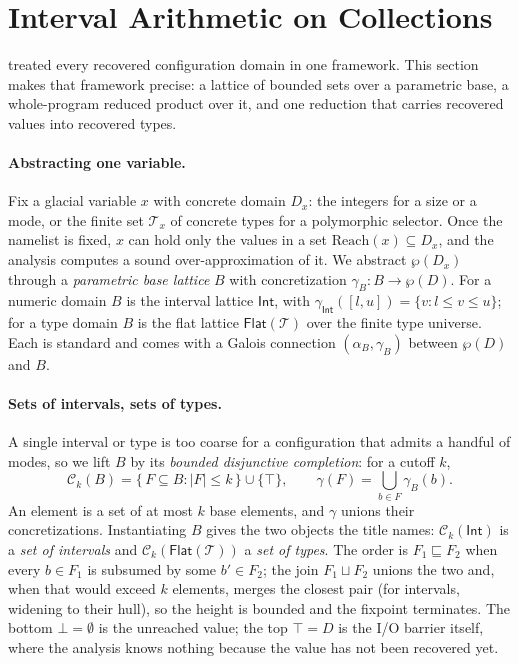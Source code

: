 \section{Interval Arithmetic on Collections}
\label{sec:approach}

 treated every recovered configuration domain in one framework. This section makes that framework precise: a lattice of bounded sets over a parametric base, a whole-program reduced product over it, and one reduction that carries recovered values into recovered types.

\paragraph{Abstracting one variable.}
Fix a glacial variable $x$ with concrete domain $D_x$: the integers for a size or a mode, or the finite set $\mathcal{T}_x$ of concrete types for a polymorphic selector. Once the namelist is fixed, $x$ can hold only the values in a set $\mathrm{Reach}(x)\subseteq D_x$, and the analysis computes a sound over-approximation of it. We abstract $\wp(D_x)$ through a \emph{parametric base lattice} $B$ with concretization $\gamma_B:B\to\wp(D)$. For a numeric domain $B$ is the interval lattice $\mathsf{Int}$, with $\gamma_{\mathsf{Int}}([l,u])=\{v:l\le v\le u\}$; for a type domain $B$ is the flat lattice $\mathsf{Flat}(\mathcal{T})$ over the finite type universe. Each is standard and comes with a Galois connection $(\alpha_B,\gamma_B)$ between $\wp(D)$ and $B$.

\paragraph{Sets of intervals, sets of types.}
A single interval or type is too coarse for a configuration that admits a handful of modes, so we lift $B$ by its \emph{bounded disjunctive completion}: for a cutoff $k$,
\[
  \mathcal{C}_k(B)=\{\,F\subseteq B : |F|\le k\,\}\cup\{\top\},
  \qquad
  \gamma(F)=\bigcup_{b\in F}\gamma_B(b).
\]
An element is a set of at most $k$ base elements, and $\gamma$ unions their concretizations. Instantiating $B$ gives the two objects the title names: $\mathcal{C}_k(\mathsf{Int})$ is a \emph{set of intervals} and $\mathcal{C}_k(\mathsf{Flat}(\mathcal{T}))$ a \emph{set of types}. The order is $F_1\sqsubseteq F_2$ when every $b\in F_1$ is subsumed by some $b'\in F_2$; the join $F_1\sqcup F_2$ unions the two and, when that would exceed $k$ elements, merges the closest pair (for intervals, widening to their hull), so the height is bounded and the fixpoint terminates. The bottom $\bot=\emptyset$ is the unreached value; the top $\top=D$ is the I/O barrier itself, where the analysis knows nothing because the value has not been recovered yet.

